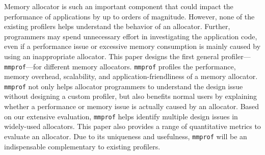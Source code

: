 Memory allocator is such an important component that could impact the performance of applications by up to orders of magnitude. However, none of the existing profilers helps understand the behavior of an allocator. Further, programmers may spend unnecessary effort in investigating the application code, even if a performance issue or excessive memory consumption is mainly caused by using an inappropriate allocator. This paper designs the first general profiler---\texttt{mmprof}---for different memory allocators. \texttt{mmprof} profiles the performance, memory overhead, scalability, and application-friendliness of a memory allocator. \texttt{mmprof} not only helps allocator programmers to understand the design issue without designing a custom profiler, but also benefits normal users by explaining whether a performance or memory issue is actually caused by an allocator. Based on our extensive evaluation, \texttt{mmprof} helps identify multiple design issues in widely-used allocators. This paper also provides a range of quantitative metrics to evaluate an allocator. Due to its uniqueness and usefulness, \texttt{mmprof} will be an indispensable complementary to existing profilers. 

 